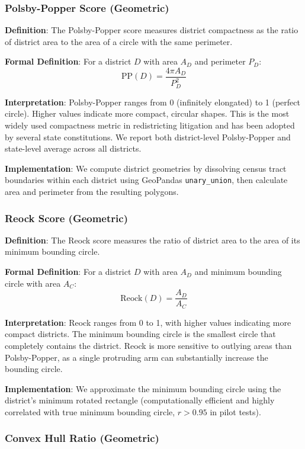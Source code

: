 \subsubsection{Polsby-Popper Score (Geometric)}

\textbf{Definition}: The Polsby-Popper score measures district compactness as the ratio of district area to the area of a circle with the same perimeter.

\textbf{Formal Definition}: For a district $D$ with area $A_D$ and perimeter $P_D$:
\[
\text{PP}(D) = \frac{4\pi A_D}{P_D^2}
\]

\textbf{Interpretation}: Polsby-Popper ranges from 0 (infinitely elongated) to 1 (perfect circle). Higher values indicate more compact, circular shapes. This is the most widely used compactness metric in redistricting litigation and has been adopted by several state constitutions. We report both district-level Polsby-Popper and state-level average across all districts.

\textbf{Implementation}: We compute district geometries by dissolving census tract boundaries within each district using GeoPandas \texttt{unary\_union}, then calculate area and perimeter from the resulting polygons.

\subsubsection{Reock Score (Geometric)}

\textbf{Definition}: The Reock score measures the ratio of district area to the area of its minimum bounding circle.

\textbf{Formal Definition}: For a district $D$ with area $A_D$ and minimum bounding circle with area $A_C$:
\[
\text{Reock}(D) = \frac{A_D}{A_C}
\]

\textbf{Interpretation}: Reock ranges from 0 to 1, with higher values indicating more compact districts. The minimum bounding circle is the smallest circle that completely contains the district. Reock is more sensitive to outlying areas than Polsby-Popper, as a single protruding arm can substantially increase the bounding circle.

\textbf{Implementation}: We approximate the minimum bounding circle using the district's minimum rotated rectangle (computationally efficient and highly correlated with true minimum bounding circle, $r > 0.95$ in pilot tests).

\subsubsection{Convex Hull Ratio (Geometric)}

